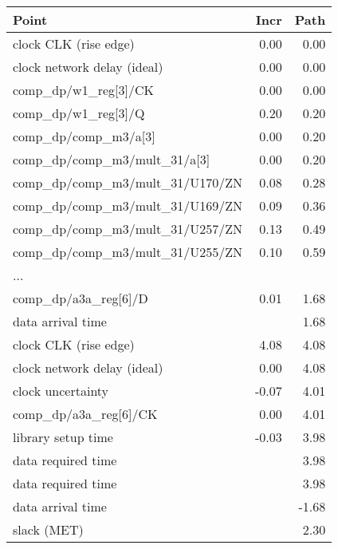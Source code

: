 \begin{tabular}[t]{|lrr|}\hline
	\textbf{Point}                                      &             \textbf{Incr }   &   \textbf{Path}\\\hline
clock CLK (rise edge)                              &     0.00   &    0.00\\
clock network delay (ideal)                         &    0.00  &     0.00\\
comp\_dp/w1\_reg[3]/CK &                           0.00   &    0.00 \\
comp\_dp/w1\_reg[3]/Q &                          0.20    &   0.20 \\
comp\_dp/comp\_m3/a[3] & 0.00  &     0.20 \\
comp\_dp/comp\_m3/mult\_31/a[3] & 0.00   &    0.20 \\
comp\_dp/comp\_m3/mult\_31/U170/ZN&               0.08     &  0.28 \\
comp\_dp/comp\_m3/mult\_31/U169/ZN &                0.09  &     0.36 \\
comp\_dp/comp\_m3/mult\_31/U257/ZN &           0.13      & 0.49 \\
comp\_dp/comp\_m3/mult\_31/U255/ZN &             0.10   &    0.59 \\  
...            & &    \\
comp\_dp/a3a\_reg[6]/D                 &     0.01   &    1.68 \\
data arrival time                               &    &               1.68\\
\hline
clock CLK (rise edge)            &                       4.08   &    4.08\\
clock network delay (ideal)                 &            0.00   &    4.08\\
clock uncertainty                          &            -0.07    &   4.01\\
comp\_dp/a3a\_reg[6]/CK &                          0.00    &   4.01 \\
library setup time            &                         -0.03    &   3.98\\
data required time                                        &  &       3.98\\
\hline
data required time                                    &    &         3.98\\
data arrival time                                     &  &          -1.68\\
\hline
slack (MET)                                       &    &             2.30\\
\hline
\end{tabular}